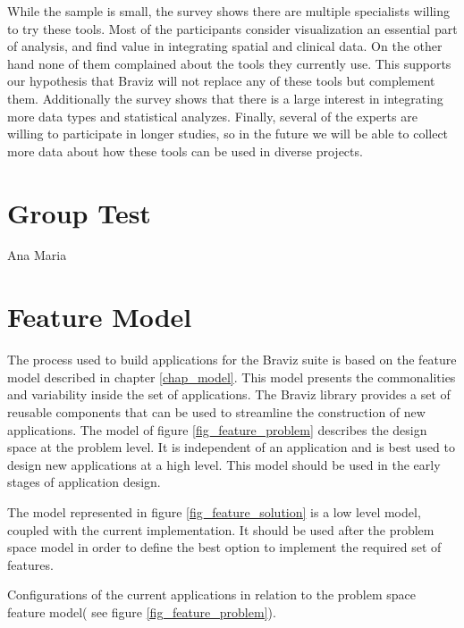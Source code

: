 \smallskip

While the sample is small, the survey shows there are multiple specialists willing to try these tools. Most of the participants consider visualization an essential part of analysis, and find value in integrating spatial and clinical data. On the other hand none of them complained about the tools they currently use. This supports our hypothesis that Braviz will not replace any of these tools but complement them. Additionally the survey shows that there is a large interest in integrating more data types and statistical analyzes. Finally, several of the experts are willing to participate in longer studies, so in the future we will be able to collect more data about how these tools can be used in diverse projects.


\section{Group Test}

Ana Maria

\section{Feature Model}


The process used to build applications for the Braviz suite is based on the feature model described in chapter \ref{chap_model}. This model presents the commonalities and variability inside the set of applications. The Braviz library provides a set of reusable components that can be used to streamline the construction of new applications. The model of figure \ref{fig_feature_problem} describes the design space at the problem level. It is independent of an application and is best used to design new applications at a high level. This model should be used in the early stages of application design. 

The model represented in figure \ref{fig_feature_solution} is a low level model, coupled with the current implementation. It should be used after the problem space model in order to define the best option to implement the required set of features. 

\begin{table}
\scriptsize
	
\caption{\label{tab_features_problem} Configurations of the current applications in relation to the problem space feature model( see figure \ref{fig_feature_problem}).}
\end{table}

